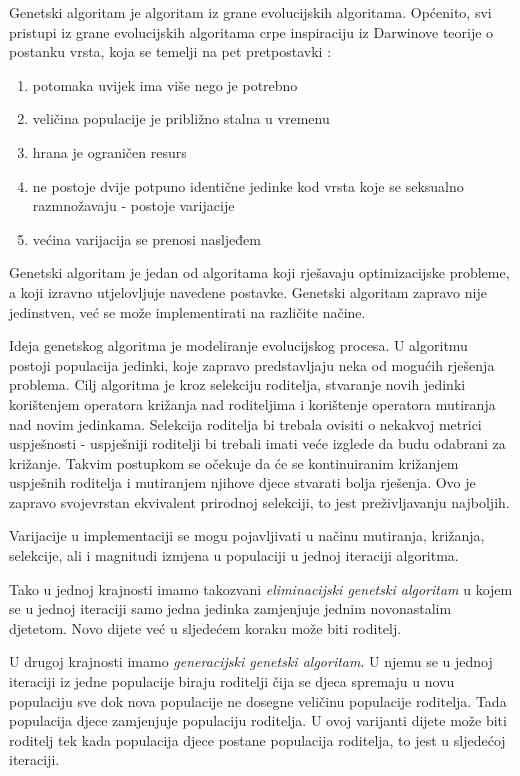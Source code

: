 \documentclass[zavrsnirad]{fer}
\begin{document}
		Genetski algoritam je algoritam iz grane evolucijskih algoritama. Općenito, svi pristupi iz grane evolucijskih algoritama crpe inspiraciju iz Darwinove teorije o postanku vrsta, koja se temelji na pet pretpostavki \cite{skriptaEvolucijskoRacunarstvo}:
		\begin{enumerate}
			\item potomaka uvijek ima više nego je potrebno
			\item veličina populacije je približno stalna u vremenu
			\item hrana je ograničen resurs
			\item ne postoje dvije potpuno identične jedinke kod vrsta koje se seksualno razmnožavaju - postoje varijacije
			\item većina varijacija se prenosi nasljeđem
		\end{enumerate}
		
		Genetski algoritam je jedan od algoritama koji rješavaju optimizacijske probleme, a koji izravno utjelovljuje navedene postavke. Genetski algoritam zapravo nije jedinstven, već se može implementirati na različite načine. \cite{skriptaEvolucijskoRacunarstvo}
		
		Ideja genetskog algoritma je modeliranje evolucijskog procesa. U algoritmu postoji populacija jedinki, koje zapravo predstavljaju neka od mogućih rješenja problema. Cilj algoritma je kroz selekciju roditelja, stvaranje novih jedinki korištenjem operatora križanja nad roditeljima i korištenje operatora mutiranja nad novim jedinkama. Selekcija roditelja bi trebala ovisiti o nekakvoj metrici uspješnosti - uspješniji roditelji bi trebali imati veće izglede da budu odabrani za križanje. Takvim postupkom se očekuje da će se kontinuiranim križanjem uspješnih roditelja i mutiranjem njihove djece stvarati bolja rješenja. Ovo je zapravo svojevrstan ekvivalent prirodnoj selekciji, to jest preživljavanju najboljih.
	
		Varijacije u implementaciji se mogu pojavljivati u načinu mutiranja, križanja, selekcije, ali i magnitudi izmjena u populaciji u jednoj iteraciji algoritma. 
		
		Tako u jednoj krajnosti imamo takozvani \textit{eliminacijski genetski algoritam} u kojem se u jednoj iteraciji samo jedna jedinka zamjenjuje jednim novonastalim djetetom. Novo dijete već u sljedećem koraku može biti roditelj.
		
		U drugoj krajnosti imamo \textit{generacijski genetski algoritam}. U njemu se u jednoj iteraciji iz jedne populacije biraju roditelji čija se djeca spremaju u novu populaciju sve dok nova populacije ne dosegne veličinu populacije roditelja. Tada populacija djece zamjenjuje populaciju roditelja. U ovoj varijanti dijete može biti roditelj tek kada populacija djece postane populacija roditelja, to jest u sljedećoj iteraciji. \cite{skriptaEvolucijskoRacunarstvo}
		
\end{document}
